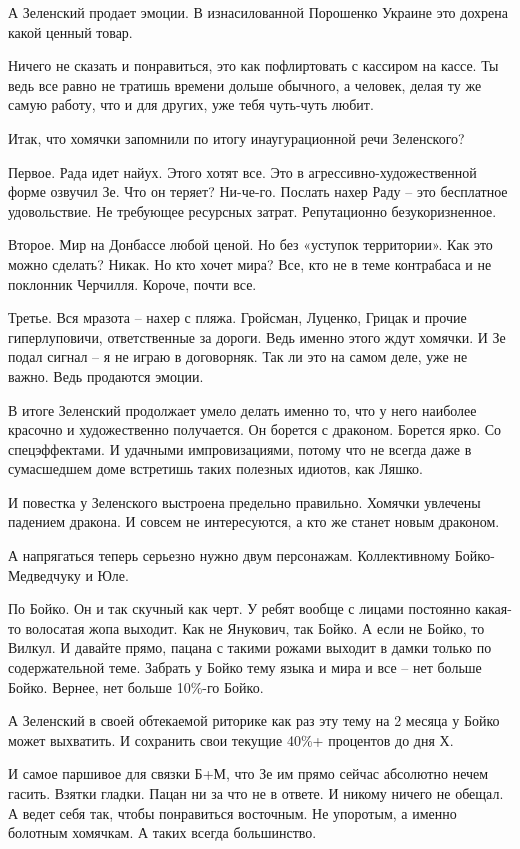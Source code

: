 А Зеленский продает эмоции. В изнасилованной Порошенко Украине это дохрена
какой ценный товар.

Ничего не сказать и понравиться, это как пофлиртовать с кассиром на кассе. Ты
ведь все равно не тратишь времени дольше обычного, а человек, делая ту же самую
работу, что и для других, уже тебя чуть-чуть любит.

Итак, что хомячки запомнили по итогу инаугурационной речи Зеленского?

Первое. Рада идет найух. Этого хотят все. Это в агрессивно-художественной форме
озвучил Зе. Что он теряет? Ни-че-го. Послать нахер Раду – это бесплатное
удовольствие. Не требующее ресурсных затрат. Репутационно безукоризненное.

Второе. Мир на Донбассе любой ценой. Но без «уступок территории». Как это можно
сделать? Никак. Но кто хочет мира? Все, кто не в теме контрабаса и не поклонник
Черчилля. Короче, почти все.

Третье. Вся мразота – нахер с пляжа. Гройсман, Луценко, Грицак и прочие
гиперлуповичи, ответственные за дороги. Ведь именно этого ждут хомячки. И Зе
подал сигнал – я не играю в договорняк. Так ли это на самом деле, уже не важно.
Ведь продаются эмоции.

В итоге Зеленский продолжает умело делать именно то, что у него наиболее
красочно и художественно получается. Он борется с драконом. Борется ярко. Со
спецэффектами. И удачными импровизациями, потому что не всегда даже в
сумасшедшем доме встретишь таких полезных идиотов, как Ляшко.

И повестка у Зеленского выстроена предельно правильно. Хомячки увлечены
падением дракона. И совсем не интересуются, а кто же станет новым драконом.

А напрягаться теперь серьезно нужно двум персонажам. Коллективному
Бойко-Медведчуку и Юле.

По Бойко. Он и так скучный как черт. У ребят вообще с лицами постоянно какая-то
волосатая жопа выходит. Как не Янукович, так Бойко. А если не Бойко, то Вилкул.
И давайте прямо, пацана с такими рожами выходит в дамки только по
содержательной теме. Забрать у Бойко тему языка и мира и все – нет больше
Бойко. Вернее, нет больше 10\%-го Бойко.

А Зеленский в своей обтекаемой риторике как раз эту тему на 2 месяца у Бойко
может выхватить. И сохранить свои текущие 40\%+ процентов до дня Х.

И самое паршивое для связки Б+М, что Зе им прямо сейчас абсолютно нечем гасить.
Взятки гладки. Пацан ни за что не в ответе. И никому ничего не обещал. А ведет
себя так, чтобы понравиться восточным. Не упоротым, а именно болотным хомячкам.
А таких всегда большинство.

